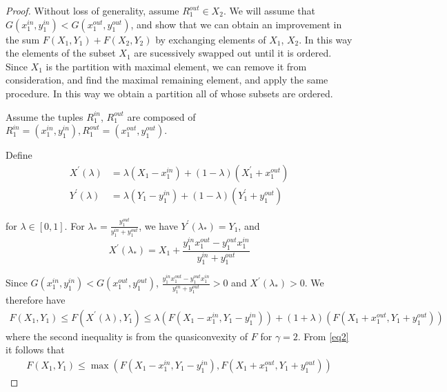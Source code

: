 \documentclass{article}
\makeatletter
\theoremstyle{case}
\def\BState{\State\hskip-\ALG@thistlm}
\makeatother
\begin{document}
\begin{proof}


 Without loss of generality, assume $R_1^{out} \in X_2$. We will assume that $G(x_1^{in}, y_1^{in}) < G(x_1^{out}, y_1^{out})$, and show that we can obtain an improvement in the sum $F(X_1, Y_1) + F(X_2, Y_2)$ by exchanging elements of $X_1$, $X_2$. In this way the elements of the subset $X_1$ are sucessively swapped out until it is ordered. Since $X_1$ is the partition with maximal element, we can remove it from consideration, and find the maximal remaining element, and apply the same procedure. In this way we obtain a partition all of whose subsets are ordered.

Assume the tuples $R_1^{in}$, $R_1^{out}$ are composed of $R_1^{in} = \left(x_1^{in}, y_1^{in}\right), R_1^{out} = \left(x_1^{out}, y_1^{out}\right)$.

Define
\begin{align*}
X^\prime\left( \lambda \right) & = \lambda \left( X_1 - x_1^{in}\right) + \left( 1 - \lambda\right) \left( X_1^\prime + x_1^{out}\right) \\
Y^\prime\left( \lambda \right) & = \lambda \left( Y_1 - y_1^{in}\right) + \left( 1 - \lambda\right) \left( Y_1^\prime + y_1^{out}\right)
\end{align*}

for $\lambda \in \left[ 0,1\right]$. For $\lambda_{*} = \frac{y_1^{out}}{y_1^{in} + y_1^{out}}$, we have $Y^\prime\left( \lambda_{*}\right) = Y_1$, and 
\[X^\prime\left( \lambda_{*}\right) = X_1 + \frac{y_1^{in}x_1^{out}-y_1^{out}x_1^{in}}{y_1^{in} + y_1^{out}}\]

Since $G(x_1^{in}, y_1^{in}) < G(x_1^{out}, y_1^{out})$, $\frac{y_1^{in}x_1^{out}-y_1^{out}x_1^{in}}{y_1^{in} + y_1^{out}} > 0$ and $X^\prime\left( \lambda_{*}\right) > 0$. We therefore have 
\begin{align} \label{eq2}
F(X_1, Y_1) \leq F(X^\prime\left( \lambda \right), Y_1) \leq \lambda\left( F(X_1-x_1^{in},Y_1-y_1^{in})\right) + \left( 1 + \lambda\right)\left( F(X_1+x_1^{out},Y_1+y_1^{out})\right)
\end{align}
where the second inequality is from the quasiconvexity of $F$ for $\gamma = 2$. From \ref{eq2} it follows that 
\begin{align} \label{eq3}
F(X_1, Y_1) \leq \max{\left(F(X_1-x_1^{in},Y_1-y_1^{in}), F(X_1+x_1^{out},Y_1+y_1^{out})\right)}
\end{align}


\end{proof}
\end{document}
